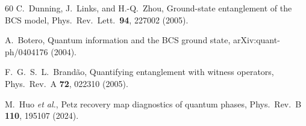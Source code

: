 \documentclass[prb,twocolumn,superscriptaddress,longbibliography,floatfix]{revtex4-2}
\begin{document}
\begin{thebibliography}{60}
C.~Dunning, J.~Links, and H.-Q.~Zhou,
Ground-state entanglement of the BCS model,
Phys.\ Rev.\ Lett.\ \textbf{94}, 227002 (2005).

A.~Botero,
Quantum information and the BCS ground state,
arXiv:quant-ph/0404176 (2004).

F.~G.~S.~L.~Brand\~ao,
Quantifying entanglement with witness operators,
Phys.\ Rev.\ A \textbf{72}, 022310 (2005).

M.~Huo \textit{et al.},
Petz recovery map diagnostics of quantum phases,
Phys.\ Rev.\ B \textbf{110}, 195107 (2024).

\end{thebibliography}
\end{document}
